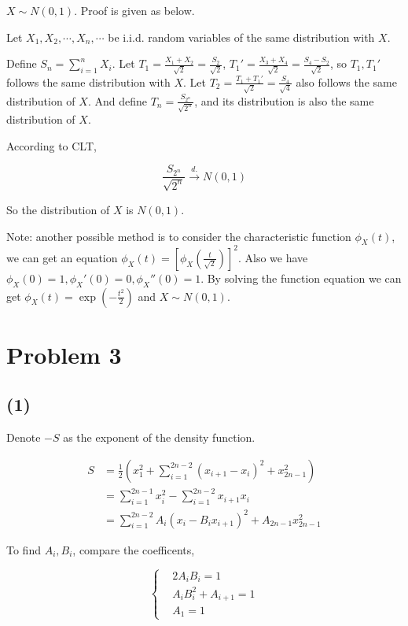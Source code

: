 \documentclass{article}
\begin{document}
$X\sim N(0,1)$. Proof is given as below.

Let $X_1,X_2, \cdots,X_n,\cdots$ be i.i.d. random variables of the same distribution with $X$. 

Define $S_n = \sum_{i=1}^n X_i$. Let $T_{1} = \frac{X_1+X_2}{ \sqrt{2}} = \frac{S_2}{\sqrt{2}}$, $T_1' = \frac{X_3+X_4}{\sqrt{ 2}} = \frac{S_4 -S_2}{ \sqrt{2}}$, so $T_1,T_1'$ follows the same distribution with $X$. Let $T_2 = \frac{T_1+T_1'}{\sqrt{2}} = \frac{S_4}{\sqrt{4}}$ also follows the same distribution of $X$. And define $T_n = \frac{S_{2^n}}{\sqrt{2^n}}$, and its distribution is also the same distribution of $X$. 

According to CLT, 

\begin{equation}
    \frac{S_{2^n}}{\sqrt{2^n}} \overset{d.}{\to} N(0,1)
\end{equation}

So the distribution of $X$ is $N(0,1)$.

Note: another possible method is to consider the characteristic function $\phi_{X}(t)$, we can get an equation $\phi_{X}(t) = [\phi_{X}(\frac{t}{\sqrt{2}})]^2$. Also we have $\phi_{X}(0) =1,\phi_{X}'(0) =0,\phi_{X}''(0) =1 $. By solving the function equation we can get $\phi_X(t) = \exp({-\frac{t^2}{2}})$ and $X \sim N(0,1)$. 

\section{Problem 3}
\subsection{(1)}
Denote $-S$ as the exponent of the density function.

\begin{equation}
    \begin{aligned}
        S & = \frac{1}{2}\left(x_{1}^{2}+\sum_{i=1}^{2 n-2}\left(x_{i+1}-x_{i}\right)^{2}+x_{2 n-1}^{2}\right) \\
        & = \sum_{i=1}^{2n-1} x_i^2 - \sum_{i=1}^{2 n-2} x_{i+1}x_i\\
        & = \sum_{i=1}^{2n-2} A_i( x_i-B_i x_{i+1})^2 + A_{2n-1} x_{2n-1}^2
    \end{aligned}
\end{equation}

To find $A_i,B_i$, compare the coefficents, 

\begin{equation}
    \left\{\begin{aligned}
        & 2 A_i B_i = 1\\
        & A_i B_i^2 + A_{i+1} = 1\\
        & A_1 = 1 
    \end{aligned}\right.
\end{equation}
\end{document}
